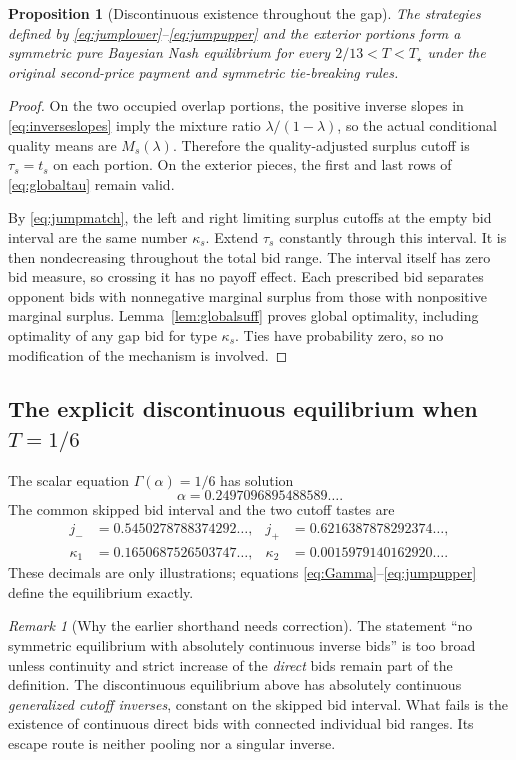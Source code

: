 \documentclass[11pt,a4paper]{article}
\numberwithin{equation}{section}
\newtheorem{proposition}[theorem]{Proposition}
\theoremstyle{definition}
\theoremstyle{remark}
\newtheorem{remark}[theorem]{Remark}
\newcommand{\Ts}{T_\star}
\begin{document}
\begin{proposition}[Discontinuous existence throughout the gap]
\label{prop:jump}
The strategies defined by \eqref{eq:jumplower}--\eqref{eq:jumpupper} and the exterior portions form a symmetric pure Bayesian Nash equilibrium for every $2/13<T<\Ts$ under the original second-price payment and symmetric tie-breaking rules.
\end{proposition}
\begin{proof}
On the two occupied overlap portions, the positive inverse slopes in \eqref{eq:inverseslopes} imply the mixture ratio $\lambda/(1-\lambda)$, so the actual conditional quality means are $M_s(\lambda)$. Therefore the quality-adjusted surplus cutoff is $\tau_s=t_s$ on each portion. On the exterior pieces, the first and last rows of \eqref{eq:globaltau} remain valid.

By \eqref{eq:jumpmatch}, the left and right limiting surplus cutoffs at the empty bid interval are the same number $\kappa_s$. Extend $\tau_s$ constantly through this interval. It is then nondecreasing throughout the total bid range. The interval itself has zero bid measure, so crossing it has no payoff effect. Each prescribed bid separates opponent bids with nonnegative marginal surplus from those with nonpositive marginal surplus. Lemma~\ref{lem:globalsuff} proves global optimality, including optimality of any gap bid for type $\kappa_s$. Ties have probability zero, so no modification of the mechanism is involved.
\end{proof}

\subsection{The explicit discontinuous equilibrium when \texorpdfstring{$T=1/6$}{T=1/6}}
The scalar equation $\Gamma(\alpha)=1/6$ has solution
\[
 \alpha=0.2497096895488589\ldots.
\]
The common skipped bid interval and the two cutoff tastes are
\begin{align*}
 j_-&=0.5450278788374292\ldots,&
 j_+&=0.6216387878292374\ldots,\\
 \kappa_1&=0.1650687526503747\ldots,&
 \kappa_2&=0.0015979140162920\ldots.
\end{align*}
These decimals are only illustrations; equations \eqref{eq:Gamma}--\eqref{eq:jumpupper} define the equilibrium exactly.

\begin{remark}[Why the earlier shorthand needs correction]
The statement ``no symmetric equilibrium with absolutely continuous inverse bids'' is too broad unless continuity and strict increase of the \emph{direct} bids remain part of the definition. The discontinuous equilibrium above has absolutely continuous \emph{generalized cutoff inverses}, constant on the skipped bid interval. What fails is the existence of continuous direct bids with connected individual bid ranges. Its escape route is neither pooling nor a singular inverse.
\end{remark}
\end{document}
